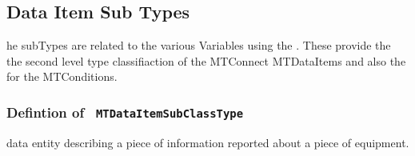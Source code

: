 \subsection{Data Item Sub Types} \label{model:DataItemSubTypes}

he \glspl{subType} are related to the various \glspl{Variable} using the . 
These provide the the second level type classifiaction of the MTConnect \glspl{MTDataItem} and 
also the  for the \glspl{MTCondition}.

\subsubsection{Defintion of \texttt{ MTDataItemSubClassType}}
  \label{type:MTDataItemSubClassType}

\FloatBarrier



data entity describing a piece of information reported about a piece of equipment.

